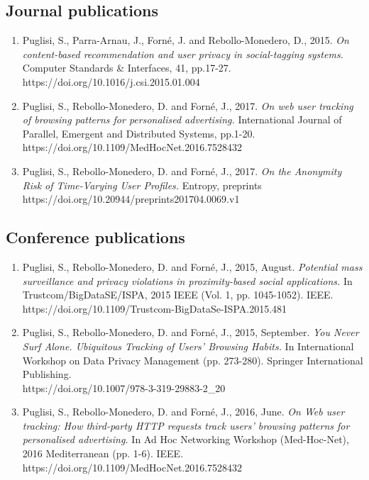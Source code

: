 \subsection{Journal publications}
\begin{enumerate}
    \item Puglisi, S., Parra-Arnau, J., Forn\'e, J. and Rebollo-Monedero, D., 2015. \emph{On content-based recommendation and user privacy in social-tagging systems.} Computer Standards \& Interfaces, 41, pp.17-27. \\
    https://doi.org/10.1016/j.csi.2015.01.004
          
    \item Puglisi, S., Rebollo-Monedero, D. and Forn\'e, J., 2017. \emph{On web user tracking of browsing patterns for personalised advertising.} International Journal of Parallel, Emergent and Distributed Systems, pp.1-20. \\
    https://doi.org/10.1109/MedHocNet.2016.7528432
    
    \item Puglisi, S., Rebollo-Monedero, D. and Forn\'e, J., 2017. \emph{On the Anonymity Risk of Time-Varying User Profiles.} Entropy, preprints \\
    https://doi.org/10.20944/preprints201704.0069.v1
\end{enumerate}

\subsection{Conference publications}
\begin{enumerate}

    \item Puglisi, S., Rebollo-Monedero, D. and Forn\'e, J., 2015, August. \emph{Potential mass surveillance and privacy violations in proximity-based social applications.} In Trustcom/BigDataSE/ISPA, 2015 IEEE (Vol. 1, pp. 1045-1052). IEEE. \\
    https://doi.org/10.1109/Trustcom-BigDataSe-ISPA.2015.481
    
    \item Puglisi, S., Rebollo-Monedero, D. and Forn\'e, J., 2015, September. \emph{You Never Surf Alone. Ubiquitous Tracking of Users’ Browsing Habits.} In International Workshop on Data Privacy Management (pp. 273-280). Springer International Publishing. \\
    https://doi.org/10.1007/978-3-319-29883-2\_20
    
    \item Puglisi, S., Rebollo-Monedero, D. and Forn\'e, J., 2016, June. \emph{On Web user tracking: How third-party HTTP requests track users' browsing patterns for personalised advertising.} In Ad Hoc Networking Workshop (Med-Hoc-Net), 2016 Mediterranean (pp. 1-6). IEEE. \\
    https://doi.org/10.1109/MedHocNet.2016.7528432

\end{enumerate}

